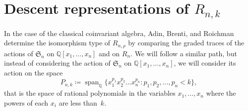 \documentclass[ALCO,ThmDefs,Unicode,epreuves]{cedram}
\DeclareMathOperator{\spanrm}{span}
\begin{document}
\section{Descent representations of \texorpdfstring{$R_{n,k}$}{Rn,k}}
\label{Rnk}
In the case of the classical coinvariant algebra, Adin, Brenti, and Roichman determine the isomorphism type of $R_{n,\rho}$ by 
comparing the graded traces of the actions of $\mathfrak{S}_n$ on $\mathbb{Q}[x_1,\ldots, x_n]$ and on $R_{n}$. We will 
follow a similar path, but instead of considering the action of $\mathfrak{S}_n$ on $\mathbb{Q}[x_1,\ldots, x_n]$, we will 
consider its action on the space 
		\begin{equation}
P_{n,k}\coloneqq \spanrm_{\mathbb{Q}}\{ x_1^{p_1}x_2^{p_2}\ldots x_n^{p_n}:p_1,p_2,\ldots, 
p_n<k\},
\end{equation}
that is the space of rational polynomials in the variables $x_1,\ldots, x_n$ where the powers of each $x_i$ are less than~$k$.
\end{document}

